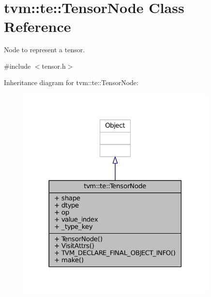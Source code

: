 \hypertarget{classtvm_1_1te_1_1TensorNode}{}\section{tvm\+:\+:te\+:\+:Tensor\+Node Class Reference}
\label{classtvm_1_1te_1_1TensorNode}


Node to represent a tensor.  




{\ttfamily \#include $<$tensor.\+h$>$}



Inheritance diagram for tvm\+:\+:te\+:\+:Tensor\+Node\+:
\nopagebreak
\begin{figure}[H]
\begin{center}
\leavevmode
\includegraphics[width=285pt]{classtvm_1_1te_1_1TensorNode__inherit__graph}
\end{center}
\end{figure}


